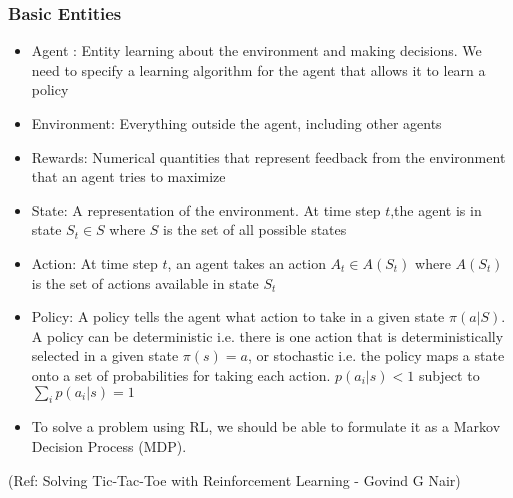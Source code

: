 



\begin{frame}[fragile]\frametitle{Basic Entities}


\begin{itemize}
\item Agent : Entity learning about the environment and making decisions. We need to specify a learning algorithm for the agent that allows it to learn a policy
\item Environment: Everything outside the agent, including other agents
\item Rewards: Numerical quantities that represent feedback from the environment that an agent tries to maximize
\item State: A representation of the environment. At time step $t$,the agent is in state $S_t \in S$ where $S$ is the set of all possible states
\item Action: At time step $t$, an agent takes an action $A_t \in A(S_t)$ where $A(S_t)$ is the set of actions available in state $S_t$
\item Policy: A policy tells the agent what action to take in a given state $\pi(a|S)$. A policy can be deterministic i.e. there is one action that is deterministically selected in a given state $\pi(s)=a$, or stochastic i.e. the policy maps a state onto a set of probabilities for taking each action. $p(a_i|s) < 1$ subject to $\sum_{i} p(a_i|s) = 1$
\item To solve a problem using RL, we should be able to formulate it as a Markov Decision Process (MDP).
\end{itemize}



{\tiny (Ref: Solving Tic-Tac-Toe with Reinforcement Learning - Govind G Nair)}

\end{frame}




